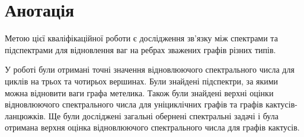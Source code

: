 \setcounter{secnumdepth}{-2}
\section{Анотація}
{
\color{red}
Метою цієї кваліфікаційної роботи є дослідження зв'язку між спектрами та підспектрами для відновлення ваг на ребрах зважених графів різних типів.

У роботі були отримані точні значення відновлюючого спектрального числа для циклів на трьох та чотирьох вершинах. Були знайдені підспектри, за якими можна відновити ваги графа метелика. Також були знайдені верхні оцінки відновлюючого спектрального числа для уніциклічних графів та графів кактусів-ланцюжків. Ще були досліджені загальні обернені спектральні задачі і була отримана верхня оцінка відновлюючого спектрального числа для графів кактусів.
}